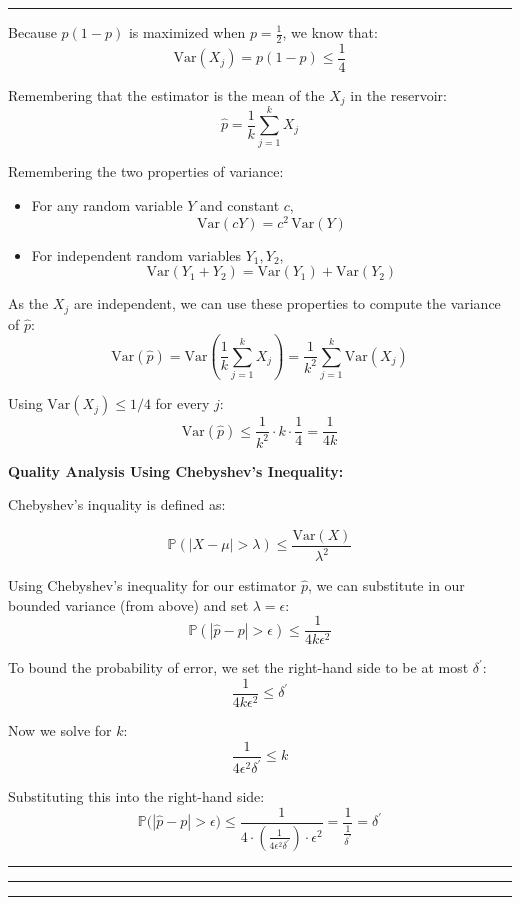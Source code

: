 \documentclass[11pt, english]{article}
\newenvironment{answer}{%
  \par\noindent\hrule %
  \vspace{0.25\baselineskip}%
  \noindent{\Large\bfseries Answer}\par\vspace{0.25\baselineskip}\noindent\ignorespaces
}{%
  \par\vspace{0.5\baselineskip}%
  \noindent\hrule\vspace{0.5\baselineskip}%
  \hrule\hrule
}
\begin{document}
\begin{answer}
Because $p(1-p)$ is maximized when $p=\tfrac12$, we know that:
\[
    \mathrm{Var}(X_j) = p(1-p) \le \frac14
\]

\bigskip

Remembering that the estimator is the mean of the $X_j$ in the reservoir:
\[
    \widehat{p} = \frac{1}{k} \sum_{j=1}^k X_j
\]

Remembering the two properties of variance:
\begin{itemize}
    \item For any random variable $Y$ and constant $c$,
    \[
        \mathrm{Var}(cY) = c^2 \, \mathrm{Var}(Y)
    \]
    \item For independent random variables $Y_1, Y_2$,
    \[
        \mathrm{Var}(Y_1 + Y_2 )
        =
        \mathrm{Var}(Y_1) + \mathrm{Var}(Y_2)
    \]
\end{itemize}


As the $X_j$ are independent, we can use these properties to compute the variance of $\widehat{p}$:
\[
    \mathrm{Var}(\widehat{p})
    =
    \mathrm{Var}\!\left( \frac{1}{k} \sum_{j=1}^k X_j \right)
    =
    \frac{1}{k^2} \sum_{j=1}^k \mathrm{Var}(X_j)
\]

Using $\mathrm{Var}(X_j) \le 1/4$ for every $j$:
\[
    \mathrm{Var}(\widehat{p})
    \le
    \frac{1}{k^2} \cdot k \cdot \frac14
    =
    \frac{1}{4k}
\]
\newpage

\textbf{Quality Analysis Using Chebyshev's Inequality:}

Chebyshev's inquality is defined as:

\[
\mathbb{P}(|X - \mu| > \lambda) \leq \frac{\text{Var}(X)}{\lambda^2}
\]

Using Chebyshev’s inequality for our estimator $\widehat{p}$, we can substitute in our bounded variance (from above) and set $\lambda = \epsilon$:
\[
    \mathbb{P}\left( |\widehat{p} - p| > \epsilon \right)
    \le
    \frac{1}{4k\epsilon^2}
\]

To bound the probability of error, we set the right-hand side to be at most $\delta^\prime$:
\[
    \frac{1}{4k\epsilon^2} \le \delta^\prime
\]

Now we solve for $k$:
\[
    \frac{1}{4\epsilon^2 \delta^\prime} \le k
\]

Substituting this into the right-hand side:
\[
    \mathbb{P}\big(|\widehat{p} - p| > \epsilon \big)
    \le \frac{1}{4 \cdot \left(\frac{1}{4 \epsilon^2 \delta^\prime}\right) \cdot \epsilon^2 }
    = \frac{1}{ \frac{1}{\delta^\prime} } 
    = \delta^\prime
\]


\end{answer}
\end{document}
